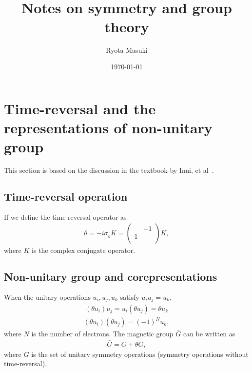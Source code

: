 \documentclass{article}
\title{Notes on symmetry and group theory}
\author{Ryota Masuki}
\date{\today}
\theoremstyle{definition}
\begin{document}
\maketitle

\section{Time-reversal and the representations of non-unitary group}
This section is based on the discussion in the textbook by Inui, et al~\cite{inui2012group}.

\subsection{Time-reversal operation}
If we define the time-reversal operator as
\begin{align}
  \theta = - i \sigma_y K = 
  \begin{pmatrix}
     & -1 \\
    1 &  \\
  \end{pmatrix}
  K,
\end{align}
where $K$ is the complex conjugate operator.

\subsection{Non-unitary group and corepresentations}
When the unitary operations $u_i, u_j, u_k$ satisfy $u_i u_j = u_k$, 
\begin{align}
  (\theta u_i) u_j = u_i (\theta u_j) = \theta u_k
\end{align}
\begin{align}
  (\theta u_i) (\theta u_j) = (-1)^N u_k,
\end{align}
where $N$ is the number of electrons. The magnetic group $\bar{G}$ can be written as
\begin{align}
  \bar{G} = G + \theta G,
\end{align}
where $G$ is the set of unitary symmetry operations (symmetry operations without time-reversal).
\end{document}
